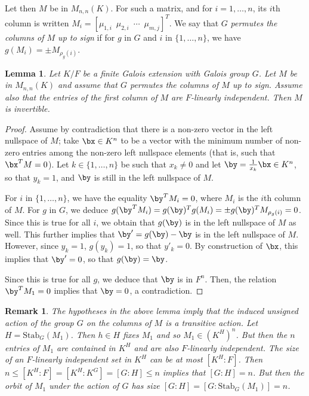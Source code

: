 \documentclass[12pt]{article}
\theoremstyle{plain}
\newtheorem{lemma}[theorem]{Lemma}
\newtheorem*{remark}{Remark}
\begin{document}
Let then $M$ be in $M_{n,n}(K)$. For such a matrix, and for
$i=1,\dots,n$, its $i$th column is written $M_i=\left[\mu_{1,i} \,\,\,
  \mu_{2,i} \,\,\, \cdots \,\,\, \mu_{m,j}\right]^T$.  We say that $G$
{\em permutes the columns of $M$ up to sign} if for $g$ in $G$ and $i$
in $\{1,\dots,n\}$, we have $g(M_i)= \pm M_{\rho_g(i)}$.
 
\begin{lemma}\label{signdet}
   Let $K/F$ be a finite Galois extension with Galois group $G$. Let
   $M$ be in $M_{n,n}(K)$ and assume that $G$ permutes the columns of
   $M$ up to sign. Assume also that the entries of the first column
 of $M$ are $F$-linearly independent. Then $M$ is invertible.
\end{lemma}
\begin{proof}
  Assume by contradiction that there is a non-zero vector in the left
  nullspace of $M$; take $\bx \in K^n$ to be a vector with the minimum number of
  non-zero entries among the non-zero left nullspace elements
  (that is, such that $\bx^T M=0$).
  Let $k \in \{1,\dots,n\}$ be such that $x_k \neq 0$ and let
  $\by=\frac 1{x_k} \bx \in K^n$, so that $y_k = 1$, and $\by$ is
  still in the left nullspace of $M$. 
  
  For $i$ in $\{1,\dots,n\}$, we have the equality $\by^T M_i = 0 $,
  where $M_i$ is the $i$th column of $M$. For $g$ in $G$, we deduce
  $g(\by^T M_i) = g(\by)^Tg(M_i) = \pm g(\by)^T M_{\rho_g(i)} = 0$. Since
  this is true for all $i$, we obtain that $g(\by)$ is in the
  left nullspace of $M$ as well. This further implies that
  $\by'=g(\by)-\by$ is in the left nullspace of $M$. However, since
  $y_k=1$, $g(y_k)=1$, so that $y'_k=0$. By construction of $\bx$, this
  implies that $\by'=0$, so that $g(\by)=\by$. 

  Since this is true for all $g$, we deduce that $\by$ is in $F^n$.
  Then, the relation $\by^T M_1=0$ implies that $\by=0$, a
  contradiction.
 \end{proof} 

\begin{remark}
The hypotheses in the above lemma imply that the induced unsigned
action of the group $G$ on the columns of $M$ is a transitive action.
Let $H=\mathrm{Stab}_G(M_1)$. Then $h\in H$ fixes $M_1$ and so $M_1\in
(K^H)^n$.  But then the $n$ entries of $M_1$ are contained in $K^H$
and are also $F$-linearly independent.  The size of an $F$-linearly
independent set in $K^H$ can be at most $[K^H:F]$.  Then $n\le
[K^H:F]=[K^H:K^G]=[G:H]\le n$ implies that $[G:H]=n$.  But then the
orbit of $M_1$ under the action of $G$ has size
$[G:H]=[G:\mathrm{Stab}_G(M_1)]=n$.
\end{remark}  
\end{document}
